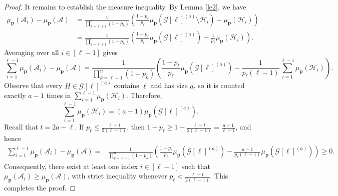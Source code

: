 \documentclass[11pt]{article}
\begin{document}
\begin{proof}
It remains to establish the measure inequality. By Lemma \ref{le2}, we have
\begin{align*}
\mu_{\mathbf{p}}(\mathcal{A}_i)-\mu_{\mathbf{p}}(\mathcal{A})&=\frac{1}{\prod_{k=\ell+1}^n(1-p_k)}
\left(
\frac{1-p_{\ell}}{p_{\ell}}\mu_{\mathbf{p}}\left(\mathcal{G}[\ell]^{(a)}\setminus \mathcal{H}_{i}\right)
-\mu_{\mathbf{p}}\left(\mathcal{H}_i\right)
\right)\\
&=\frac{1}{\prod_{k=\ell+1}^n(1-p_k)}
\left(
\frac{1-p_{\ell}}{p_{\ell}}\mu_{\mathbf{p}}\left(\mathcal{G}[\ell]^{(a)}\right)
-\frac{1}{p_{\ell}}\mu_{\mathbf{p}}\left(\mathcal{H}_i\right)
\right).
\end{align*}
Averaging over all $i \in [\ell-1]$ gives
$$
\sum_{i=1}^{\ell-1} \mu_{\mathbf{p}}(\mathcal{A}_i) - \mu_{\mathbf{p}}(\mathcal{A})
=\frac{1}{\prod_{k=\ell+1}^n(1-p_k)}
\left(
\frac{1-p_{\ell}}{p_{\ell}}\mu_{\mathbf{p}}\left(\mathcal{G}[\ell]^{(a)}\right)
-\frac{1}{p_{\ell}(\ell-1)}\sum_{i=1}^{\ell-1}\mu_{\mathbf{p}}\left(\mathcal{H}_i\right)
\right).
$$
Observe that every $H \in \mathcal{G}[\ell]^{(a)}$ contains $\ell$ and has size $a$,  so it is counted exactly $a-1$ times in $\sum_{i=1}^{\ell-1}\mu_{\mathbf{p}}(\mathcal{H}_i)$. Therefore,
$$
\sum_{i=1}^{\ell-1}\mu_{\mathbf{p}}(\mathcal{H}_i)
=
(a-1)\mu_{\mathbf{p}}\left( \mathcal{G}[\ell]^{(a)} \right).
$$
Recall that $t=2a-\ell$. If $p_{\ell}\leq \frac{\ell-t}{2(\ell-1)}$, then $1-p_{\ell}\geq 1-\frac{\ell-t}{2(\ell-1)}=\frac{a-1}{\ell-1}$, and hence
\begin{align*}
\sum_{i=1}^{\ell-1} \mu_{\mathbf{p}}(\mathcal{A}_i) - \mu_{\mathbf{p}}(\mathcal{A})
=&\frac{1}{\prod_{k=\ell+1}^n(1-p_k)}
\left(
\frac{1-p_{\ell}}{p_{\ell}}\mu_{\mathbf{p}}\left(\mathcal{G}[\ell]^{(a)}\right)
-\frac{a-1}{p_{\ell}(\ell-1)}\mu_{\mathbf{p}}\left( \mathcal{G}[\ell]^{(a)} \right)
\right)\geq 0.
\end{align*}
Consequently, there exist at least one index $i\in[\ell-1]$ such that $
\mu_{\mathbf{p}}(\mathcal{A}_i)\geq \mu_{\mathbf{p}}(\mathcal{A})$, with strict inequality  whenever $p_{\ell}<\frac{\ell-t}{2(\ell-1)}$.
This completes the proof.
\end{proof}
\end{document}
